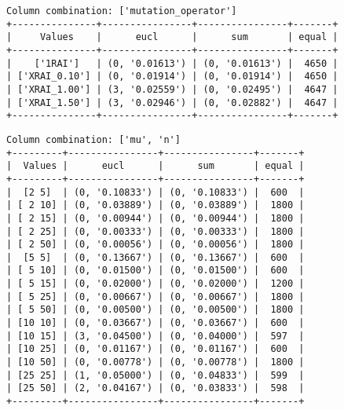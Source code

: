 \documentclass{article}
\begin{document}
\begin{verbatim}
Column combination: ['mutation_operator']
+---------------+----------------+----------------+-------+
|     Values    |      eucl      |      sum       | equal |
+---------------+----------------+----------------+-------+
|    ['1RAI']   | (0, '0.01613') | (0, '0.01613') |  4650 |
| ['XRAI_0.10'] | (0, '0.01914') | (0, '0.01914') |  4650 |
| ['XRAI_1.00'] | (3, '0.02559') | (0, '0.02495') |  4647 |
| ['XRAI_1.50'] | (3, '0.02946') | (0, '0.02882') |  4647 |
+---------------+----------------+----------------+-------+
\end{verbatim}

\begin{verbatim}
Column combination: ['mu', 'n']
+---------+----------------+----------------+-------+
|  Values |      eucl      |      sum       | equal |
+---------+----------------+----------------+-------+
|  [2 5]  | (0, '0.10833') | (0, '0.10833') |  600  |
| [ 2 10] | (0, '0.03889') | (0, '0.03889') |  1800 |
| [ 2 15] | (0, '0.00944') | (0, '0.00944') |  1800 |
| [ 2 25] | (0, '0.00333') | (0, '0.00333') |  1800 |
| [ 2 50] | (0, '0.00056') | (0, '0.00056') |  1800 |
|  [5 5]  | (0, '0.13667') | (0, '0.13667') |  600  |
| [ 5 10] | (0, '0.01500') | (0, '0.01500') |  600  |
| [ 5 15] | (0, '0.02000') | (0, '0.02000') |  1200 |
| [ 5 25] | (0, '0.00667') | (0, '0.00667') |  1800 |
| [ 5 50] | (0, '0.00500') | (0, '0.00500') |  1800 |
| [10 10] | (0, '0.03667') | (0, '0.03667') |  600  |
| [10 15] | (3, '0.04500') | (0, '0.04000') |  597  |
| [10 25] | (0, '0.01167') | (0, '0.01167') |  600  |
| [10 50] | (0, '0.00778') | (0, '0.00778') |  1800 |
| [25 25] | (1, '0.05000') | (0, '0.04833') |  599  |
| [25 50] | (2, '0.04167') | (0, '0.03833') |  598  |
+---------+----------------+----------------+-------+
\end{verbatim}
\end{document}
